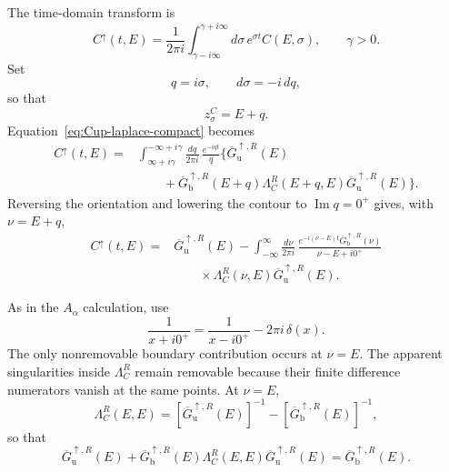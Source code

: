 \documentclass[
 reprint,
 superscriptaddress,
 amsmath,amssymb,
 aps,prb,
 longbibliography,
 floatfix
]{revtex4-2}
\begin{document}
The time-domain transform is
\begin{equation*}
C^\uparrow(t,E)
=
\frac{1}{2\pi i}
\int_{\gamma-i\infty}^{\gamma+i\infty}
d\sigma\,
e^{\sigma t}
C(E,\sigma),
\qquad
\gamma>0.
\end{equation*}
Set
\begin{equation*}
q=i\sigma,
\qquad
d\sigma=-i\,dq,
\end{equation*}
so that
\begin{equation*}
z_\sigma^C=E+q.
\end{equation*}
Equation~\eqref{eq:Cup-laplace-compact} becomes
\begin{align*}
C^\uparrow(t,E)
={}&
\int_{\infty+i\gamma}^{-\infty+i\gamma}
\frac{dq}{2\pi i}\,
\frac{e^{-iqt}}{q}
\Bigg\{
\overline G_{\mathrm u}^{\uparrow,R}(E)
\\
&\qquad+
\overline G_{\mathrm b}^{\uparrow,R}(E+q)
\Lambda_C^R(E+q,E)
\overline G_{\mathrm u}^{\uparrow,R}(E)
\Bigg\}.
\end{align*}
Reversing the orientation and lowering the contour to $\operatorname{Im}q=0^+$ gives, with $\nu=E+q$,
\begin{align*}
C^\uparrow(t,E)
={}&
\overline G_{\mathrm u}^{\uparrow,R}(E)
-
\int_{-\infty}^{\infty}
\frac{d\nu}{2\pi i}\,
\frac{
e^{-i(\nu-E)t}
\overline G_{\mathrm b}^{\uparrow,R}(\nu)}
{\nu-E+i0^+}
\\
&\qquad\times
\Lambda_C^R(\nu,E)
\overline G_{\mathrm u}^{\uparrow,R}(E).
\end{align*}

As in the $A_\alpha$ calculation, use
\begin{equation*}
\frac{1}{x+i0^+}
=
\frac{1}{x-i0^+}
-
2\pi i\,\delta(x).
\end{equation*}
The only nonremovable boundary contribution occurs at $\nu=E$. The apparent singularities inside $\Lambda_C^R$ remain removable because their finite difference numerators vanish at the same points. At $\nu=E$,
\begin{equation*}
\Lambda_C^R(E,E)
=
\left[
\overline G_{\mathrm u}^{\uparrow,R}(E)
\right]^{-1}
-
\left[
\overline G_{\mathrm b}^{\uparrow,R}(E)
\right]^{-1},
\end{equation*}
so that
\begin{equation*}
\overline G_{\mathrm u}^{\uparrow,R}(E)
+
\overline G_{\mathrm b}^{\uparrow,R}(E)
\Lambda_C^R(E,E)
\overline G_{\mathrm u}^{\uparrow,R}(E)
=
\overline G_{\mathrm b}^{\uparrow,R}(E).
\end{equation*}
\end{document}
